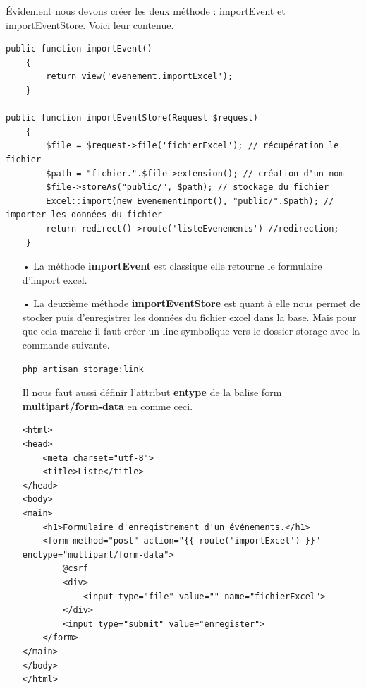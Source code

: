 \documentclass[12pt,a4paper]{article}
\begin{document}
Évidement nous devons créer les deux méthode : importEvent et importEventStore.
Voici leur contenue.
\begin{verbatim}
public function importEvent()
    {
        return view('evenement.importExcel');
    }

public function importEventStore(Request $request)
    {
        $file = $request->file('fichierExcel'); // récupération le fichier
        $path = "fichier.".$file->extension(); // création d'un nom 
        $file->storeAs("public/", $path); // stockage du fichier
        Excel::import(new EvenementImport(), "public/".$path); // importer les données du fichier
        return redirect()->route('listeEvenements') //redirection;
    }
\end{verbatim}
\begin{itemize}
\item[•] La méthode \textbf{importEvent} est classique elle retourne le formulaire
d'import excel.
\item[•] La deuxième méthode \textbf{importEventStore} est quant à elle nous permet de stocker puis d’enregistrer les données du fichier excel dans la base. Mais pour que cela marche il faut créer un line symbolique vers le dossier storage avec la commande suivante.
\begin{verbatim}
php artisan storage:link
\end{verbatim}
Il nous faut aussi définir l'attribut \textbf{entype} de la balise form \textbf{multipart/form-data} en comme ceci.
\begin{verbatim}
<html>
<head>
    <meta charset="utf-8">
    <title>Liste</title>
</head>
<body>
<main>
    <h1>Formulaire d'enregistrement d'un événements.</h1>
    <form method="post" action="{{ route('importExcel') }}" enctype="multipart/form-data">
        @csrf
        <div>
            <input type="file" value="" name="fichierExcel">
        </div>
        <input type="submit" value="enregister">
    </form>
</main>
</body>
</html>
\end{verbatim}
\end{itemize}
\end{document}
